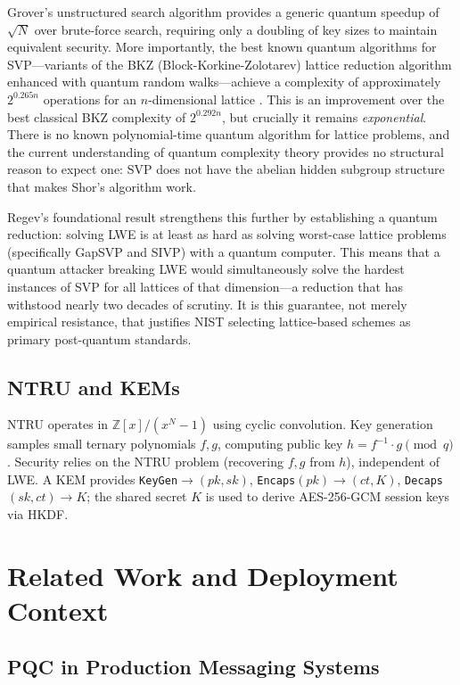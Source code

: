 \documentclass[11pt,a4paper]{article}
\begin{document}
Grover's unstructured search algorithm \cite{bernstein2017} provides a generic quantum speedup of $\sqrt{N}$ over brute-force search, requiring only a doubling of key sizes to maintain equivalent security. More importantly, the best known quantum algorithms for SVP---variants of the BKZ (Block-Korkine-Zolotarev) lattice reduction algorithm enhanced with quantum random walks---achieve a complexity of approximately $2^{0.265n}$ operations for an $n$-dimensional lattice \cite{peikert2016}. This is an improvement over the best classical BKZ complexity of $2^{0.292n}$, but crucially it remains \emph{exponential}. There is no known polynomial-time quantum algorithm for lattice problems, and the current understanding of quantum complexity theory provides no structural reason to expect one: SVP does not have the abelian hidden subgroup structure that makes Shor's algorithm work.

Regev's foundational result \cite{regev2005} strengthens this further by establishing a quantum reduction: solving LWE is at least as hard as solving worst-case lattice problems (specifically GapSVP and SIVP) with a quantum computer. This means that a quantum attacker breaking LWE would simultaneously solve the hardest instances of SVP for all lattices of that dimension---a reduction that has withstood nearly two decades of scrutiny. It is this guarantee, not merely empirical resistance, that justifies NIST selecting lattice-based schemes as primary post-quantum standards.

\subsection{NTRU and KEMs}

NTRU \cite{hoffstein1998} operates in $\mathbb{Z}[x]/(x^N-1)$ using cyclic convolution. Key generation samples small ternary polynomials $f,g$, computing public key $h=f^{-1}\cdot g\pmod{q}$. Security relies on the NTRU problem (recovering $f,g$ from $h$), independent of LWE. A KEM provides \texttt{KeyGen}$\to(pk,sk)$, \texttt{Encaps}$(pk)\to(ct,K)$, \texttt{Decaps}$(sk,ct)\to K$; the shared secret $K$ is used to derive AES-256-GCM session keys via HKDF.

\section{Related Work and Deployment Context}

\subsection{PQC in Production Messaging Systems}
\end{document}

